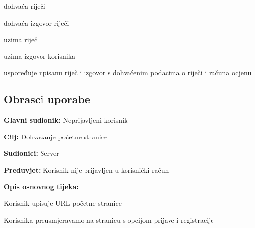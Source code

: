 \begin{packed_enum}
				\item {}
				\begin{packed_enum}
					\item dohvaća riječi
					\item dohvaća izgovor riječi
				\end{packed_enum}
				
				\item {}
				\begin{packed_enum}
					\item uzima riječ
					\item uzima izgovor korisnika
					\item uspoređuje upisanu riječ i izgovor s dohvaćenim podacima o riječi i računa ocjenu
				\end{packed_enum}
				
			\end{packed_enum}
			
			\eject 
			
			
				
			\subsection{Obrasci uporabe}

					\noindent {}
					\begin{packed_item}
						\item \textbf{Glavni sudionik:} Neprijavljeni korisnik
						\item \textbf{Cilj:} Dohvaćanje početne stranice
						\item \textbf{Sudionici:} Server
						\item \textbf{Preduvjet:} Korisnik nije prijavljen u korisnički račun
						\item \textbf{Opis osnovnog tijeka:}
						\begin{packed_enum}
							\item Korisnik upisuje URL početne stranice
							\item Korisnika preusmjeravamo na stranicu s opcijom prijave i registracije
						\end{packed_enum}
					\end{packed_item}

